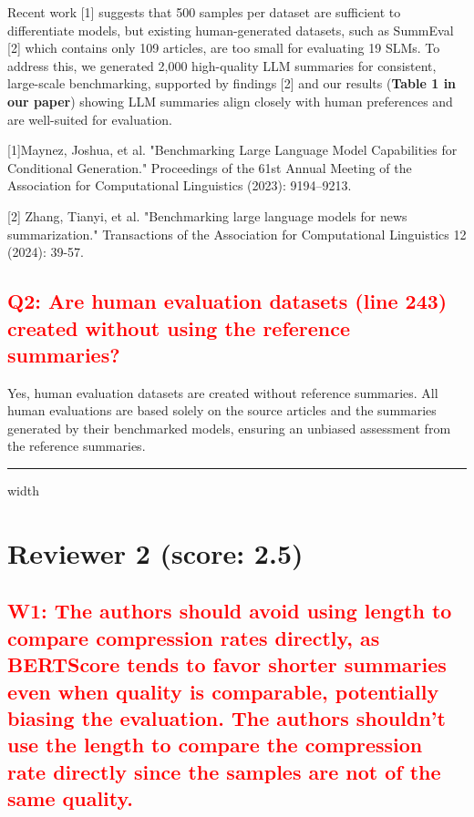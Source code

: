 \documentclass[a4paper]{article}
\begin{document}
Recent work [1] suggests that 500 samples per dataset are sufficient to differentiate models, but existing human-generated datasets, such as SummEval [2] which contains only 109 articles, are too small for evaluating 19 SLMs. To address this, we generated 2,000 high-quality LLM summaries for consistent, large-scale benchmarking, supported by findings [2] and our results (\textbf{Table 1 in our paper}) showing LLM summaries align closely with human preferences and are well-suited for evaluation.

[1]Maynez, Joshua, et al. "Benchmarking Large Language Model Capabilities for Conditional Generation." Proceedings of the 61st Annual Meeting of the Association for Computational Linguistics (2023): 9194–9213.

[2] Zhang, Tianyi, et al. "Benchmarking large language models for news summarization." Transactions of the Association for Computational Linguistics 12 (2024): 39-57.

\subsection{\textcolor{red}{Q2: Are human evaluation datasets (line 243) created without using the reference summaries?}}

Yes, human evaluation datasets are created without reference summaries. All human evaluations are based solely on the source articles and the summaries generated by their benchmarked models, ensuring an unbiased assessment from the reference summaries.

\vspace{5mm}
\hrule height 0.5mm width \textwidth
\vspace{5mm}


\section{Reviewer 2 (score: 2.5)}
\subsection{\textcolor{red}{W1: The authors should avoid using length to compare compression rates directly, as BERTScore tends to favor shorter summaries even when quality is comparable, potentially biasing the evaluation. The authors shouldn't use the length to compare the compression rate directly since the samples are not of the same quality.}}

\end{document}
